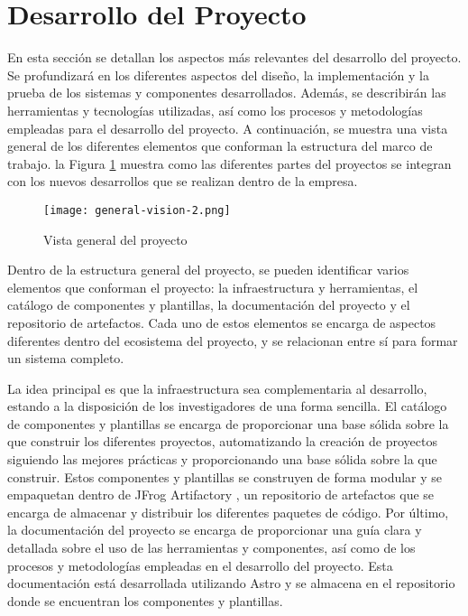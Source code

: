 \section{Desarrollo del Proyecto}
En esta sección se detallan los aspectos más relevantes del desarrollo del proyecto.
Se profundizará en los diferentes aspectos del diseño, la implementación y la
prueba de los sistemas y componentes desarrollados. Además, se describirán las
herramientas y tecnologías utilizadas, así como los procesos y metodologías
empleadas para el desarrollo del proyecto. A continuación, se muestra una vista general de los diferentes elementos
que conforman la estructura del marco de trabajo. la Figura \ref{fig:general-vision} muestra como las diferentes
partes del proyectos se integran con los nuevos desarrollos que se realizan dentro de la empresa.

\begin{figure}[ht]
    \centering
    \texttt{[image: general-vision-2.png]}
    \caption{Vista general del proyecto}
    \label{fig:general-vision}
\end{figure}

Dentro de la estructura general del proyecto, se pueden identificar varios elementos
que conforman el proyecto: la infraestructura y herramientas, el catálogo de componentes y 
plantillas, la documentación del proyecto y el repositorio de artefactos. Cada uno de estos elementos 
se encarga de aspectos diferentes dentro del ecosistema del proyecto, y se relacionan entre sí para formar
un sistema completo. \medskip

La idea principal es que la infraestructura sea complementaria
al desarrollo, estando a la disposición de los investigadores de una forma sencilla. El catálogo
de componentes y plantillas se encarga de proporcionar una base sólida sobre la que
construir los diferentes proyectos, automatizando la creación de proyectos siguiendo 
las mejores prácticas y proporcionando una base sólida sobre la que construir. Estos
componentes y plantillas se construyen de forma modular y se empaquetan dentro de
JFrog Artifactory \cite{Artifactory}, un repositorio de artefactos que se encarga de almacenar y distribuir
los diferentes paquetes de código. Por último, la documentación del proyecto se encarga de 
proporcionar una guía clara y detallada sobre el uso de las herramientas y componentes, así 
como de los procesos y metodologías empleadas en el desarrollo del proyecto. Esta documentación
está desarrollada utilizando Astro \cite{Astro} y se almacena en el repositorio donde se encuentran los
componentes y plantillas. \medskip






\pagebreak
